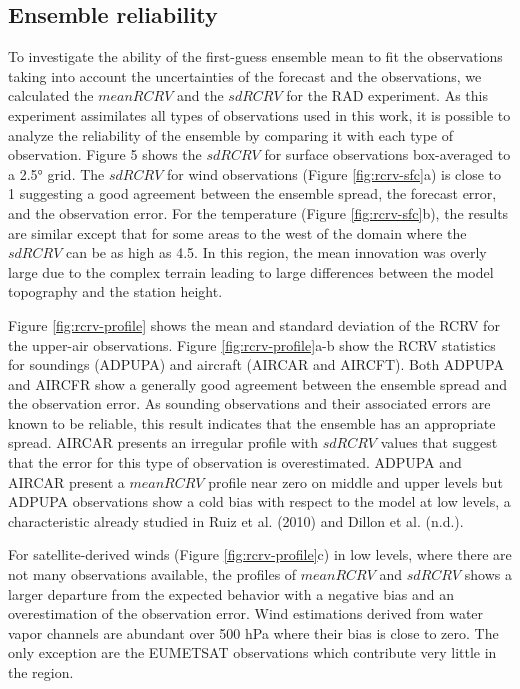 \documentclass[final,5p,times,twocolumn,authoryear]{elsarticle} %
\begin{document}
\hypertarget{ensemble-reliability}{%
\subsection{Ensemble reliability}\label{ensemble-reliability}}

To investigate the ability of the first-guess ensemble mean to fit the observations taking into account the uncertainties of the forecast and the observations, we calculated the \(mean RCRV\) and the \(sd RCRV\) for the RAD experiment. As this experiment assimilates all types of observations used in this work, it is possible to analyze the reliability of the ensemble by comparing it with each type of observation. Figure 5 shows the \(sd RCRV\) for surface observations box-averaged to a 2.5° grid. The \(sd RCRV\) for wind observations (Figure \ref{fig:rcrv-sfc}a) is close to 1 suggesting a good agreement between the ensemble spread, the forecast error, and the observation error. For the temperature (Figure \ref{fig:rcrv-sfc}b), the results are similar except that for some areas to the west of the domain where the \(sd RCRV\) can be as high as 4.5. In this region, the mean innovation was overly large due to the complex terrain leading to large differences between the model topography and the station height.

Figure \ref{fig:rcrv-profile} shows the mean and standard deviation of the RCRV for the upper-air observations. Figure \ref{fig:rcrv-profile}a-b show the RCRV statistics for soundings (ADPUPA) and aircraft (AIRCAR and AIRCFT). Both ADPUPA and AIRCFR show a generally good agreement between the ensemble spread and the observation error. As sounding observations and their associated errors are known to be reliable, this result indicates that the ensemble has an appropriate spread. AIRCAR presents an irregular profile with \(sd RCRV\) values that suggest that the error for this type of observation is overestimated. ADPUPA and AIRCAR present a \(mean RCRV\) profile near zero on middle and upper levels but ADPUPA observations show a cold bias with respect to the model at low levels, a characteristic already studied in Ruiz et al. (2010) and Dillon et al. (n.d.).

For satellite-derived winds (Figure \ref{fig:rcrv-profile}c) in low levels, where there are not many observations available, the profiles of \(mean RCRV\) and \(sd RCRV\) shows a larger departure from the expected behavior with a negative bias and an overestimation of the observation error. Wind estimations derived from water vapor channels are abundant over 500 hPa where their bias is close to zero. The only exception are the EUMETSAT observations which contribute very little in the region.
\end{document}
